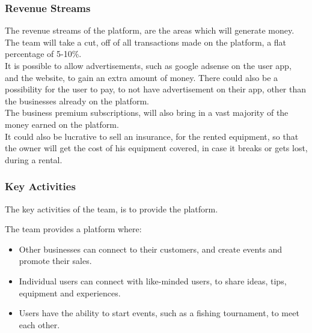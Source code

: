 \subsubsection{Revenue Streams}
The revenue streams of the platform, are the areas which will generate money.\\

The team will take a cut, off of all transactions made on the platform, a flat percentage of 5-10\%.\\

It is possible to allow advertisements, such as google adsense \cite{adsense} on the user app, and the website, to gain an extra amount of money. There could also be a possibility for the user to pay, to not have advertisement on their app, other than the businesses already on the platform.\\

The business premium subscriptions, will also bring in a vast majority of the money earned on the platform.\\

It could also be lucrative to sell an insurance, for the rented equipment, so that the owner will get the cost of his equipment covered, in case it breaks or gets lost, during a rental.

\subsubsection{Key Activities}
The key activities of the team, is to provide the platform.

The team provides a platform where: 
\begin{itemize}
	\item Other businesses can connect to their customers, and create events and promote their sales.
	\item Individual users can connect with like-minded users, to share ideas, tips, equipment and experiences.
	\item Users have the ability to start events, such as a fishing tournament, to meet each other.
\end{itemize}

